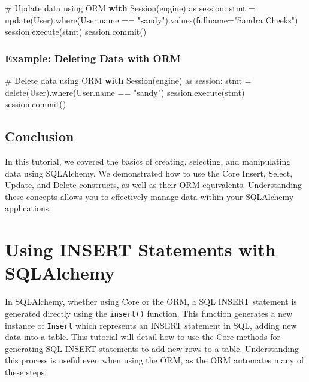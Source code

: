 \documentclass[
  letterpaper,
  DIV=11,
  numbers=noendperiod]{scrreprt}
\newenvironment{Shaded}{\begin{snugshade}}{\end{snugshade}}
\newcommand{\CommentTok}[1]{\textcolor[rgb]{0.37,0.37,0.37}{#1}}
\newcommand{\ControlFlowTok}[1]{\textcolor[rgb]{0.00,0.23,0.31}{\textbf{#1}}}
\newcommand{\ImportTok}[1]{\textcolor[rgb]{0.00,0.46,0.62}{#1}}
\newcommand{\NormalTok}[1]{\textcolor[rgb]{0.00,0.23,0.31}{#1}}
\newcommand{\OperatorTok}[1]{\textcolor[rgb]{0.37,0.37,0.37}{#1}}
\newcommand{\StringTok}[1]{\textcolor[rgb]{0.13,0.47,0.30}{#1}}
\begin{document}
\begin{Shaded}
\begin{Highlighting}[]
\CommentTok{\# Update data using ORM}
\ControlFlowTok{with}\NormalTok{ Session(engine) }\ImportTok{as}\NormalTok{ session:}
\NormalTok{    stmt }\OperatorTok{=}\NormalTok{ update(User).where(User.name }\OperatorTok{==} \StringTok{"sandy"}\NormalTok{).values(fullname}\OperatorTok{=}\StringTok{"Sandra Cheeks"}\NormalTok{)}
\NormalTok{    session.execute(stmt)}
\NormalTok{    session.commit()}
\end{Highlighting}
\end{Shaded}

\subsubsection{Example: Deleting Data with
ORM}\label{example-deleting-data-with-orm}

\begin{Shaded}
\begin{Highlighting}[]
\CommentTok{\# Delete data using ORM}
\ControlFlowTok{with}\NormalTok{ Session(engine) }\ImportTok{as}\NormalTok{ session:}
\NormalTok{    stmt }\OperatorTok{=}\NormalTok{ delete(User).where(User.name }\OperatorTok{==} \StringTok{"sandy"}\NormalTok{)}
\NormalTok{    session.execute(stmt)}
\NormalTok{    session.commit()}
\end{Highlighting}
\end{Shaded}

\subsection{Conclusion}\label{conclusion-19}

In this tutorial, we covered the basics of creating, selecting, and
manipulating data using SQLAlchemy. We demonstrated how to use the Core
Insert, Select, Update, and Delete constructs, as well as their ORM
equivalents. Understanding these concepts allows you to effectively
manage data within your SQLAlchemy applications.

\section{Using INSERT Statements with
SQLAlchemy}\label{using-insert-statements-with-sqlalchemy}

In SQLAlchemy, whether using Core or the ORM, a SQL INSERT statement is
generated directly using the \texttt{insert()} function. This function
generates a new instance of \texttt{Insert} which represents an INSERT
statement in SQL, adding new data into a table. This tutorial will
detail how to use the Core methods for generating SQL INSERT statements
to add new rows to a table. Understanding this process is useful even
when using the ORM, as the ORM automates many of these steps.
\end{document}
